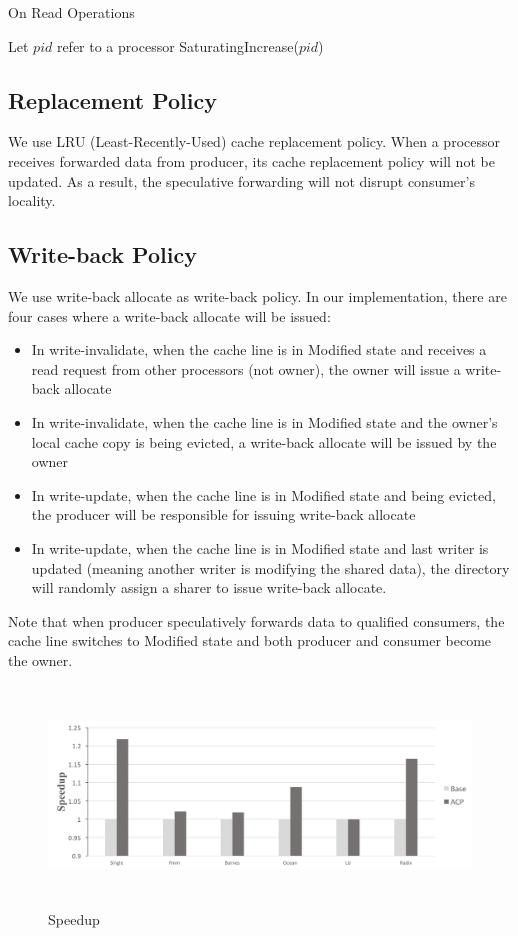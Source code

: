 \documentclass[conference]{IEEEtran}
\begin{document}
\begin{algorithm}
\caption{On Read Operations}
\label{read_operations}
\begin{algorithmic}[1]
\State Let $pid$ refer to a processor
    \State SaturatingIncrease($pid$) 
\EndFor
\end{algorithmic}
\end{algorithm}


\subsection{Replacement Policy}
We use LRU (Least-Recently-Used) cache replacement policy. When a processor receives forwarded data from producer, its cache replacement policy will not be updated. As a result, the speculative forwarding will not disrupt consumer's locality.

\subsection{Write-back Policy}
We use write-back allocate as write-back policy. In our implementation, there are four cases where a write-back allocate will be issued:
\begin{itemize}
  \item In write-invalidate, when the cache line is in Modified state and receives a read request from other processors (not owner), the owner will issue a write-back allocate
  \item In write-invalidate, when the cache line is in Modified state and the owner's local cache copy is being evicted, a write-back allocate will be issued by the owner
  \item In write-update, when the cache line is in Modified state and being evicted, the producer will be responsible for issuing write-back allocate
  \item In write-update, when the cache line is in Modified state and last writer is updated (meaning another writer is modifying the shared data), the directory will randomly assign a sharer to issue write-back allocate.
\end{itemize}
Note that when producer speculatively forwards data to qualified consumers, the cache line switches to Modified state and both producer and consumer become the owner.

\newpage

\begin{figure}[!h]
\centering
\hfil
\captionsetup{justification=centering}
\includegraphics[width=7.5in,height=2.3in]{speedup.png}
\caption{Speedup}
\label{speedup}
\end{figure}
\FloatBarrier
\end{document}
